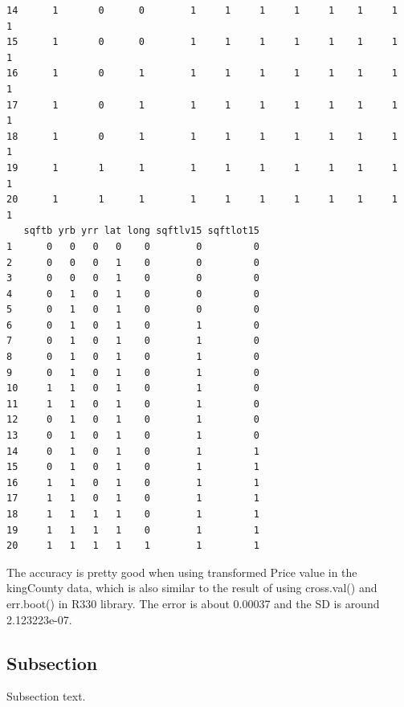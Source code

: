 \documentclass{article}%
\begin{document}
\begin{verbatim}
14      1       0      0        1     1     1     1     1    1     1     1
15      1       0      0        1     1     1     1     1    1     1     1
16      1       0      1        1     1     1     1     1    1     1     1
17      1       0      1        1     1     1     1     1    1     1     1
18      1       0      1        1     1     1     1     1    1     1     1
19      1       1      1        1     1     1     1     1    1     1     1
20      1       1      1        1     1     1     1     1    1     1     1
   sqftb yrb yrr lat long sqftlv15 sqftlot15
1      0   0   0   0    0        0         0
2      0   0   0   1    0        0         0
3      0   0   0   1    0        0         0
4      0   1   0   1    0        0         0
5      0   1   0   1    0        0         0
6      0   1   0   1    0        1         0
7      0   1   0   1    0        1         0
8      0   1   0   1    0        1         0
9      0   1   0   1    0        1         0
10     1   1   0   1    0        1         0
11     1   1   0   1    0        1         0
12     0   1   0   1    0        1         0
13     0   1   0   1    0        1         0
14     0   1   0   1    0        1         1
15     0   1   0   1    0        1         1
16     1   1   0   1    0        1         1
17     1   1   0   1    0        1         1
18     1   1   1   1    0        1         1
19     1   1   1   1    0        1         1
20     1   1   1   1    1        1         1
\end{verbatim}

The accuracy is pretty good when using transformed Price value in the kingCounty data, which is also similar to the result of using cross.val() and err.boot() in R330 library. The error is about 0.00037 and the SD is around 2.123223e-07. 


\subsection{Subsection}
Subsection text.
\end{document}
